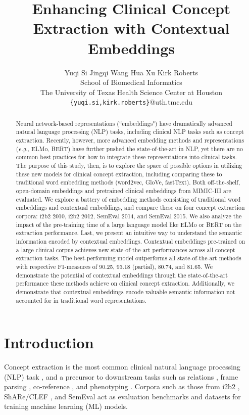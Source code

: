 \documentclass[11pt,a4paper]{article}
\title{Enhancing Clinical Concept Extraction with Contextual Embeddings}
\author{Yuqi Si \qquad Jingqi Wang \qquad Hua Xu \qquad Kirk Roberts \\School of Biomedical Informatics\\
The University of Texas Health Science Center at Houston
\\
\texttt{\{yuqi.si,kirk.roberts\}}@uth.tmc.edu}
\date{}
\begin{document}
\maketitle
\begin{abstract}

Neural network-based representations (``embeddings") have dramatically advanced natural language processing (NLP) tasks, including clinical NLP tasks such as concept extraction. Recently, however, more advanced embedding methods and representations (\emph{e.g.}, ELMo, BERT) have further pushed the state-of-the-art in NLP, yet there are no common best practices for how to integrate these representations into clinical tasks. The purpose of this study, then, is to explore the space of possible options in utilizing these new models for clinical concept extraction, including comparing these to traditional word embedding methods (word2vec, GloVe, fastText). Both off-the-shelf, open-domain embeddings and pretrained clinical embeddings from MIMIC-III are evaluated. We explore a battery of embedding methods consisting of traditional word embeddings and contextual embeddings, and compare these on four concept extraction corpora: i2b2 2010, i2b2 2012, SemEval 2014, and SemEval 2015. We also analyze the impact of the pre-training time of a large language model like ELMo or BERT on the extraction performance. Last, we present an intuitive way to understand the semantic information encoded by contextual embeddings. Contextual embeddings pre-trained on a large clinical corpus achieves new state-of-the-art performances across all concept extraction tasks. The best-performing model outperforms all state-of-the-art methods with respective F1-measures of 90.25, 93.18 (partial), 80.74, and 81.65. We demonstrate the potential of contextual embeddings through the state-of-the-art performance these methods achieve on clinical concept extraction. Additionally, we demonstrate that contextual embeddings encode valuable semantic information not accounted for in traditional word representations.

  
\end{abstract}

\section{Introduction}

Concept extraction is the most common clinical natural language processing (NLP) task \cite{tang2013recognizing,kundeti2016clinical,unanue2017recurrent,wang2018clinical}, and a precursor to downstream tasks such as relations \cite{rink2011automatic}, frame parsing \cite{gupta2018automatic, si2018frame}, co-reference \cite{lee2011stanford}, and phenotyping \cite{xu2011extracting, velupillai2018using}. Corpora such as those from i2b2 \cite{uzuner20112010, sun2013evaluating, stubbs2015automated}, ShARe/CLEF \cite{suominen2013overview,kelly2014overview}, and SemEval \cite{pradhan2014semeval,elhadad2015semeval,bethard2016semeval} act as evaluation benchmarks and datasets for training machine learning (ML) models.
\end{document}
